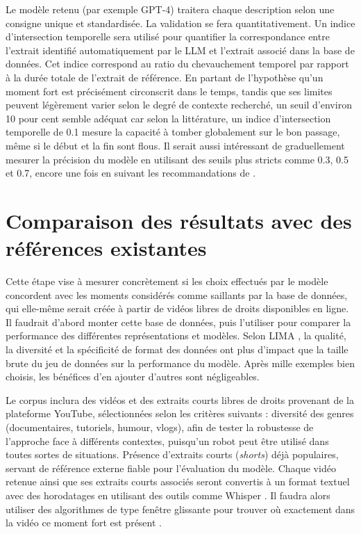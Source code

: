 Le modèle retenu (par exemple GPT-4) traitera chaque description selon une consigne unique et standardisée. La validation se fera quantitativement. Un indice d'intersection temporelle sera utilisé pour quantifier la correspondance entre l'extrait identifié automatiquement par le LLM et l'extrait associé dans la base de données. Cet indice correspond au ratio du chevauchement temporel par rapport à la durée totale de l'extrait de référence. En partant de l’hypothèse qu’un moment fort est précisément circonscrit dans le temps, tandis que ses limites peuvent légèrement varier selon le degré de contexte recherché, un seuil d’environ 10 pour cent semble adéquat car selon la littérature, un indice d'intersection temporelle de 0.1 mesure la capacité à tomber globalement sur le bon passage, même si le début et la fin sont flous. Il serait aussi intéressant de graduellement mesurer la précision du modèle en utilisant des seuils plus stricts comme 0.3, 0.5 et 0.7, encore une fois en suivant les recommandations de \cite{chae2024_benchmark}.



\section{Comparaison des résultats avec des références existantes}

Cette étape vise à mesurer concrètement si les choix effectués par le modèle concordent avec les moments considérés comme saillants par la base de données, qui elle-même serait créée à partir de vidéos libres de droits disponibles en ligne. Il faudrait d'abord monter cette base de données, puis l'utiliser pour comparer la performance des différentes représentations et modèles. Selon LIMA \cite{zhou2023lima}, la qualité, la diversité et la spécificité de format des données ont plus d’impact que la taille brute du jeu de données sur la performance du modèle. Après mille exemples bien choisis, les bénéfices d’en ajouter d’autres sont négligeables.

Le corpus inclura des vidéos et des extraits courts libres de droits provenant de la plateforme YouTube, sélectionnées selon les critères suivants : diversité des genres (documentaires, tutoriels, humour, vlogs), afin de tester la robustesse de l'approche face à différents contextes, puisqu'un robot peut être utilisé dans toutes sortes de situations. Présence d'extraits courts (\textit{shorts}) déjà populaires, servant de référence externe fiable pour l'évaluation du modèle. Chaque vidéo retenue ainsi que ses extraits courts associés seront convertis à un format textuel avec des horodatages en utilisant des outils comme Whisper \cite{radford2023_whisper}. Il faudra alors utiliser des algorithmes de type fenêtre glissante pour trouver où exactement dans la vidéo ce moment fort est présent \cite{chae2024_benchmark}.

